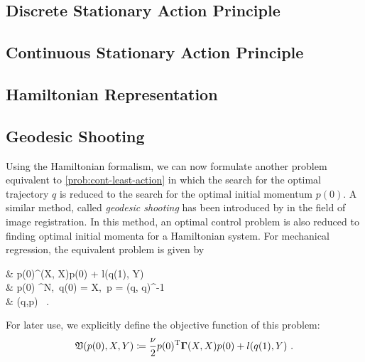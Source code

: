 \subsection{Discrete Stationary Action Principle}



\subsection{Continuous Stationary Action Principle}



\subsection{Hamiltonian Representation}



\subsection{Geodesic Shooting}

Using the Hamiltonian formalism, we can now formulate another problem equivalent to \cref{prob:cont-least-action} in which the search for the optimal trajectory $q$ is reduced to the search for the optimal initial momentum $p(0)$.
A similar method, called \emph{geodesic shooting} has been introduced by \citet{allassonniere05} in the field of image registration.
In this method, an optimal control problem is also reduced to finding optimal initial momenta for a Hamiltonian system.
For mechanical regression, the equivalent problem is given by
\begin{problem}
	\label{prob:geodesic-shooting}
	\begin{cases}
		&  p(0)^\T \bGamma(X, X)p(0) + l(q(1), Y)\\
		 & p(0) \in \cX^N,\ q(0) = X,\ p = \bGamma(q, q)^{-1}\\
		& (q,p)  \ .
	\end{cases}
\end{problem}
For later use, we explicitly define the objective function of this problem:
\begin{equation}
\label{eq:geodesic-shooting-objective}
\mathfrak{V}(p(0), X, Y) \coloneqq \frac{\nu}{2} p(0)^{\mathrm{T}} \mathbf{\Gamma}(X, X)p(0) + l(q(1), Y) \ .
\end{equation}

